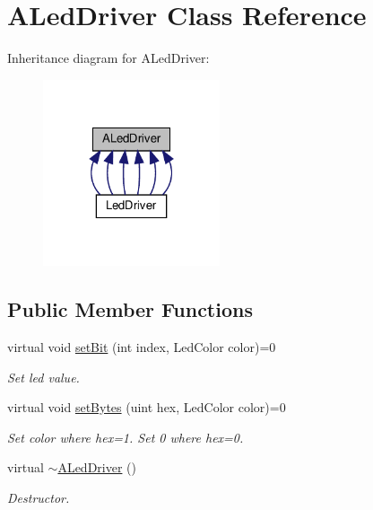 \hypertarget{classALedDriver}{}\section{A\+Led\+Driver Class Reference}
\label{classALedDriver}


Inheritance diagram for A\+Led\+Driver\+:
\nopagebreak
\begin{figure}[H]
\begin{center}
\leavevmode
\includegraphics[width=148pt]{classALedDriver__inherit__graph}
\end{center}
\end{figure}
\subsection*{Public Member Functions}
\begin{DoxyCompactItemize}
\item 
virtual void \hyperlink{classALedDriver_acbc8507c36f0f4fa3afb845d81e56eb2}{set\+Bit} (int index, Led\+Color color)=0
\begin{DoxyCompactList}\small\item\em Set led value. \end{DoxyCompactList}\item 
virtual void \hyperlink{classALedDriver_a3a219f7546870d4bce0ae36cad3b0518}{set\+Bytes} (uint hex, Led\+Color color)=0
\begin{DoxyCompactList}\small\item\em Set color where hex=1. Set 0 where hex=0. \end{DoxyCompactList}\item 
\mbox{\label{classALedDriver_ad5b6e2342c40194df04be1f34149f0ec}} 
virtual \hyperlink{classALedDriver_ad5b6e2342c40194df04be1f34149f0ec}{$\sim$\+A\+Led\+Driver} ()
\begin{DoxyCompactList}\small\item\em Destructor. \end{DoxyCompactList}\end{DoxyCompactItemize}
